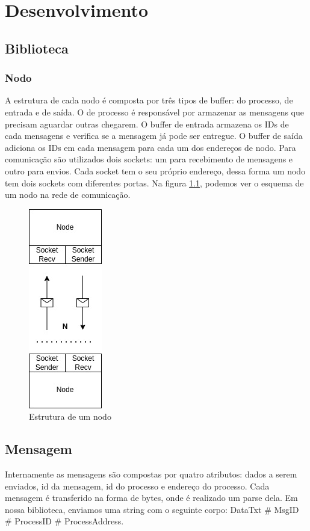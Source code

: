 \documentclass[
	12pt,				%
	openright,			%
	oneside,			%
	a4paper,			%
	english,			%
	french,				%
	spanish,			%
	brazil				%
	]{abntex2}
\begin{document}
\chapter{Desenvolvimento}
\section{Biblioteca}
\subsection{Nodo}

A estrutura de cada nodo é composta por três tipos de buffer: do processo, de entrada e de saída.
O de processo é responsável por armazenar as mensagens que precisam aguardar outras chegarem.
O buffer de entrada armazena os IDs de cada mensagens e verifica se a mensagem já pode ser entregue.
O buffer de saída adiciona os IDs em cada mensagem para cada um dos endereços de nodo.
Para comunicação são utilizados dois sockets: um para recebimento de
mensagens e outro para envios. Cada socket tem o seu próprio endereço,
dessa forma um nodo tem dois sockets com diferentes portas. Na figura \ref{fig:nodo},
podemos ver o esquema de um nodo na rede de comunicação.

\begin{figure}[!h]
    \centering
    \includegraphics[scale=0.9]{node.jpg}
    \caption{Estrutura de um nodo}
    \label{fig:nodo}
\end{figure}

\section{Mensagem}
Internamente as mensagens são compostas por quatro atributos: dados a serem enviados, id da mensagem,
id do processo e endereço do processo. Cada mensagem é transferido na forma de bytes,
onde é realizado um parse dela. Em nossa biblioteca, enviamos uma string com o seguinte
corpo: DataTxt \# MsgID \# ProcessID \# ProcessAddress.
\end{document}

